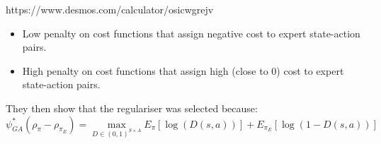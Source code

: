 \documentclass{article}
\begin{document}
https://www.desmos.com/calculator/osicwgrejv

\begin{itemize}
\item Low penalty on cost functions that assign negative cost to expert state-action pairs.
\item High penalty on cost functions that assign high (close to 0) cost to expert state-action pairs.
\end{itemize}

They then show that the regulariser was selected because:
\[\psi^{*}_{GA}(\rho_{\pi}-\rho_{\pi_{E}}) = \max_{D \in (0,1)^{S \times A}} E_{\pi} [\log (D(s,a))] + E_{\pi_{E}} [\log (1 - D(s,a))]\]
\end{document}

